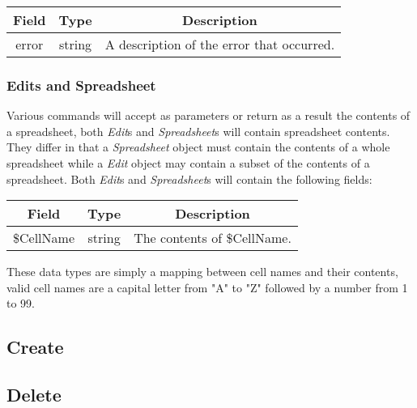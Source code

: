 \begin{table}[H]
    \begin{center}
        \begin{tabular}{|c|c|c|}\hline
            Field & Type & Description \\\hline
            error & string & A description of the error that occurred. \\\hline
        \end{tabular}
    \end{center}
\end{table}

\subsubsection{Edits and Spreadsheet}
\label{sec:message:edits}
\label{sec:message:spreadsheet}

Various commands will accept as parameters or return as a result the contents of a spreadsheet,
both \emph{Edit}s and \emph{Spreadsheet}s will contain spreadsheet contents. They differ in that
a \emph{Spreadsheet} object must contain the contents of a whole spreadsheet while a \emph{Edit}
object may contain a subset of the contents of a spreadsheet. Both \emph{Edit}s and \emph{Spreadsheet}s
will contain the following fields:

\begin{table}[H]
    \begin{center}
        \begin{tabular}{|c|c|c|}\hline
            Field & Type & Description \\\hline
            \$CellName & string & The contents of \$CellName. \\\hline
        \end{tabular}
    \end{center}
\end{table}

These data types are simply a mapping between cell names and their contents, valid cell names are a
capital letter from "A" to "Z" followed by a number from 1 to 99.

\subsection{Create}
\label{sec:message:create}


\subsection{Delete}
\label{sec:message:delete}


